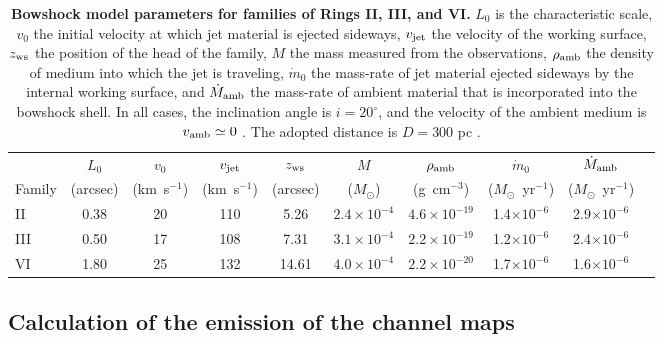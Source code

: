 \documentclass[12pt]{mythesis}
\begin{document}
\begin{table}[p!]
{\footnotesize
\begin{tabular}{lccccccccc}
\hline
& 
\multicolumn{1}{c}{$L_0$} & 
\multicolumn{1}{c}{$v_0$} & 
\multicolumn{1}{c}{$v_{\rm jet}$} & 
\multicolumn{1}{c}{$z_{\rm ws}$} & 
\multicolumn{1}{c}{$M$} & 
\multicolumn{1}{c}{$\rho_{\rm amb}$} &
\multicolumn{1}{c}{$\dot{m}_0$} & 
\multicolumn{1}{c}{$\dot{M}_{{\rm amb}}$} \\
Family & 
\multicolumn{1}{c}{(arcsec)} & 
\multicolumn{1}{c}{(km~s$^{-1}$)} & 
\multicolumn{1}{c}{(km~s$^{-1}$)} & 
\multicolumn{1}{c}{(arcsec)} & 
\multicolumn{1}{c}{($M_\odot$)} & 
\multicolumn{1}{c}{(g~cm$^{-3}$)} & 
\multicolumn{1}{c}{($M_\odot$~yr$^{-1}$)} &
\multicolumn{1}{c}{($M_\odot$~yr$^{-1}$)} \\
\hline
II & 0.38 & 20 & 110 & 5.26  & $2.4\times10^{-4}$ & $4.6\times10^{-19}$  & 1.4$\times10^{-6}$ & 2.9$\times10^{-6}$ \\
III& 0.50 & 17 & 108 & 7.31  & $3.1\times10^{-4}$ & $2.2\times10^{-19}$  & 1.2$\times10^{-6}$ & 2.4$\times10^{-6}$ \\
VI & 1.80 & 25 & 132 & 14.61 & $4.0\times10^{-4}$ & $2.2\times10^{-20}$ & 1.7$\times10^{-6}$ & 1.6$\times10^{-6}$ \\
\hline
\end{tabular}
\caption[Bowshock model parameters for families of Rings II, III, and VI.]{{\bf Bowshock model parameters for families of Rings II, III, and VI.} $L_0$ is the characteristic scale, $v_0$ the initial velocity at which jet material is ejected sideways, $v_{\rm jet}$ the velocity of the working surface, $z_{\rm ws}$ the position of the head of the family, $M$ the mass measured from the observations, $\rho_{\rm amb}$ the density of medium into which the jet is traveling, $\dot{m}_0$ the mass-rate of jet material ejected sideways by the internal working surface, and $\dot{M}_{\rm amb}$ the mass-rate of ambient material that is incorporated into the bowshock shell. In all cases, the inclination angle is $i=20^\circ$, and the velocity of the ambient medium is $v_{\rm amb} \simeq 0$ \kms. The adopted distance is $D=300$ pc \citep{ortiz-leon2018, gaia2023}.}
}
\end{table}



\subsection{Calculation of the emission of the channel maps}
\end{document}
